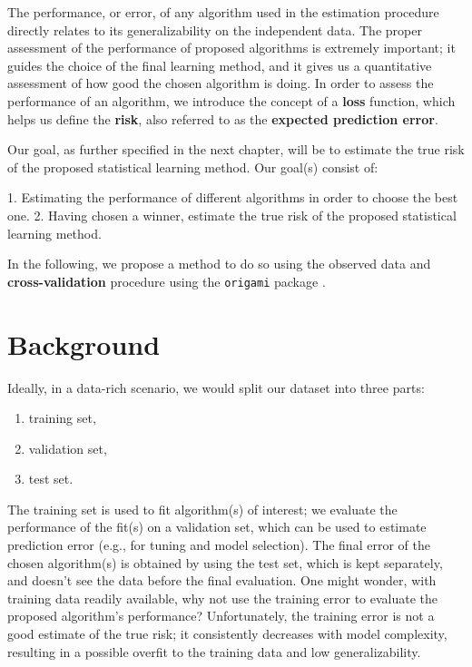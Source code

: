\documentclass[
  12pt, krantz2,
]{krantz}
\newcommand{\passthrough}[1]{#1}
\providecommand{\tightlist}{%
  \setlength{\itemsep}{0pt}\setlength{\parskip}{0pt}}
\theoremstyle{definition}
\theoremstyle{definition}
\theoremstyle{definition}
\newcommand{\1}{\mathbbm{1}}
\begin{document}
The performance, or error, of any algorithm used in the estimation procedure
directly relates to its generalizability on the independent data. The proper
assessment of the performance of proposed algorithms is extremely important; it
guides the choice of the final learning method, and it gives us a quantitative
assessment of how good the chosen algorithm is doing. In order to assess the
performance of an algorithm, we introduce the concept of a \textbf{loss} function,
which helps us define the \textbf{risk}, also referred to as the \textbf{expected
prediction error}.

\begin{shortbox}
Our goal, as further specified in the next chapter, will be
to estimate the true risk of the proposed statistical learning method. Our
goal(s) consist of:

1. Estimating the performance of different algorithms in order to choose the
   best one.
2. Having chosen a winner, estimate the true risk of the proposed
   statistical learning method.
\end{shortbox}

In the following, we propose a method to do so using the observed data and
\textbf{cross-validation} procedure using the \passthrough{\lstinline!origami!} package \citep{coyle2018origami}.

\hypertarget{background}{%
\section{Background}\label{background}}

Ideally, in a data-rich scenario, we would split our dataset into three parts:

\begin{enumerate}
\def\labelenumi{\arabic{enumi}.}
\tightlist
\item
  training set,
\item
  validation set,
\item
  test set.
\end{enumerate}

The training set is used to fit algorithm(s) of interest; we evaluate the
performance of the fit(s) on a validation set, which can be used to estimate
prediction error (e.g., for tuning and model selection). The final error of the
chosen algorithm(s) is obtained by using the test set, which is kept separately,
and doesn't see the data before the final evaluation. One might wonder, with
training data readily available, why not use the training error to evaluate the
proposed algorithm's performance? Unfortunately, the training error is not a
good estimate of the true risk; it consistently decreases with model complexity,
resulting in a possible overfit to the training data and low generalizability.
\end{document}
